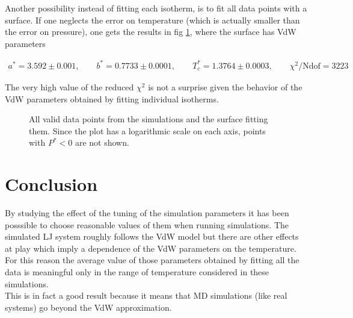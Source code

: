 \documentclass[a4paper, 11pt]{article}
\begin{document}
    Another possibility instead of fitting each isotherm, is to fit all data points with a surface. If one neglects the error on temperature (which is actually smaller than the error on pressure), one gets the results in fig \ref{fig:all_data_fit}, where the surface has VdW parameters

    \begin{gather*}
      a^* = 3.592 \pm 0.001, \qquad b^* = 0.7733 \pm 0.0001, \qquad T_c^* = 1.3764 \pm 0.0003, \qquad \chi^2/\text{Ndof} = 3223
    \end{gather*}

    The very high value of the reduced $\chi^2$ is not a surprise given the behavior of the VdW parameters obtained by fitting individual isotherms.


    \begin{figure}[H]
      \centering
      \caption{All valid data points from the simulations and the surface fitting them. Since the plot has a logarithmic scale on each axis, points with $P^* < 0$ are not shown.}
      \label{fig:all_data_fit}
    \end{figure}


\section{Conclusion}
  By studying the effect of the tuning of the simulation parameters it has been posssible to choose reasonable values of them when running simulations.
  The simulated LJ system roughly follows the VdW model but there are other effects at play which imply a dependence of the VdW parameters on the temperature. For this reason the average value of those parameters obtained by fitting all the data is meaningful only in the range of temperature considered in these simulations.\\
  This is in fact a good result because it means that MD simulations (like real systems) go beyond the VdW approximation.
\end{document}
